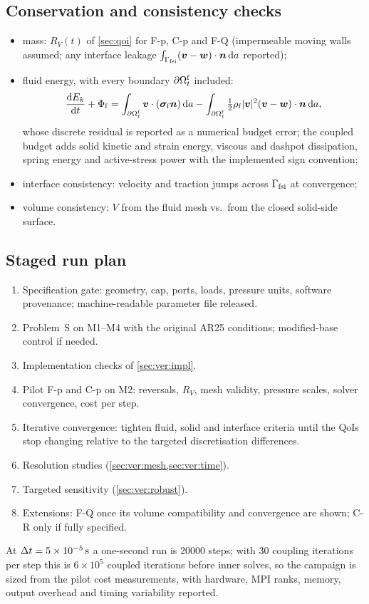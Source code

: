 \subsection{Conservation and consistency checks}\label{sec:ver:cons}
\begin{itemize}
\item mass: $R_V(t)$ of \cref{sec:qoi} for F-p, C-p and F-Q (impermeable
  moving walls assumed; any interface leakage
  $\int_{\Gamma_{\mathrm{fsi}}}(\bm{v}-\bm{w})\cdot\bm{n}\,\mathrm da$ reported);
\item fluid energy, with every boundary $\partial\Omega^{\mathrm{f}}_t$ included:
  \begin{equation}
  \frac{\mathrm dE_k}{\mathrm dt} + \Phi_{\mathrm f} =
  \int_{\partial\Omega^{\mathrm{f}}_t}\bm{v}\cdot(\bm{\sigma}_{\mathrm f}\bm{n})\,\mathrm da
  - \int_{\partial\Omega^{\mathrm{f}}_t}\tfrac12\rho_{\mathrm f}|\bm{v}|^2(\bm{v}-\bm{w})\cdot\bm{n}\,\mathrm da,
  \end{equation}
  whose discrete residual is reported as a numerical budget error; the
  coupled budget adds solid kinetic and strain energy, viscous and dashpot
  dissipation, spring energy and active-stress power with the implemented
  sign convention;
\item interface consistency: velocity and traction jumps across $\Gamma_{\mathrm{fsi}}$ at
  convergence;
\item volume consistency: $V$ from the fluid mesh vs.\ from the closed
  solid-side surface.
\end{itemize}

\subsection{Staged run plan}\label{sec:ver:plan}
\begin{enumerate}
\item Specification gate: geometry, cap, ports, loads, pressure units,
  software provenance; machine-readable parameter file released.
\item Problem~S on M1--M4 with the original AR25 conditions; modified-base
  control if needed.
\item Implementation checks of \cref{sec:ver:impl}.
\item Pilot F-p and C-p on M2: reversals, $R_V$, mesh validity, pressure
  scales, solver convergence, cost per step.
\item Iterative convergence: tighten fluid, solid and interface criteria
  until the QoIs stop changing relative to the targeted discretisation
  differences.
\item Resolution studies (\cref{sec:ver:mesh,sec:ver:time}).
\item Targeted sensitivity (\cref{sec:ver:robust}).
\item Extensions: F-Q once its volume compatibility and convergence are
  shown; C-R only if fully specified.
\end{enumerate}
At $\Delta t=\SI{5e-5}{s}$ a one-second run is \num{20000} steps; with 30
coupling iterations per step this is $6\times10^{5}$ coupled iterations
before inner solves, so the campaign is sized from the pilot cost
measurements, with hardware, MPI ranks, memory, output overhead and timing
variability reported.
